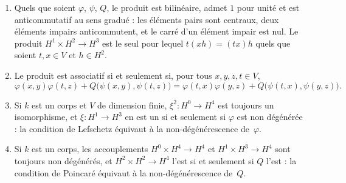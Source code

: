 \begin{encadre}
\begin{theoreme}\label{thm:16-hodge}\leavevmode
\begin{enumerate}
\item Quels que soient $\varphi$, $\psi$, $Q$, le produit est bilinéaire, admet $1$ pour unité et est anticommutatif au sens gradué : les éléments pairs sont centraux, deux éléments impairs anticommutent, et le carré d'un élément impair est nul. Le produit $H^1 \times H^2 \to H^3$ est le seul pour lequel $t(xh) = (tx)h$ quels que soient $t, x \in V$ et $h \in H^2$.
\item Le produit est associatif si et seulement si, pour tous $x, y, z, t \in V$,
\[
\varphi(x,y)\varphi(t,z) + Q\bigl(\psi(x,y), \psi(t,z)\bigr) = \varphi(t,x)\varphi(y,z) + Q\bigl(\psi(t,x), \psi(y,z)\bigr).
\]
\item Si $k$ est un corps et $V$ de dimension finie, $\xi^2 \colon H^0 \to H^4$ est toujours un isomorphisme, et $\xi \colon H^1 \to H^3$ en est un si et seulement si $\varphi$ est non dégénérée : la condition de Lefschetz équivaut à la non-dégénérescence de~$\varphi$.
\item Si $k$ est un corps, les accouplements $H^0 \times H^4 \to H^4$ et $H^1 \times H^3 \to H^4$ sont toujours non dégénérés, et $H^2 \times H^2 \to H^4$ l'est si et seulement si $Q$ l'est : la condition de Poincaré équivaut à la non-dégénérescence de~$Q$.
\end{enumerate}
\end{theoreme}
\end{encadre}

